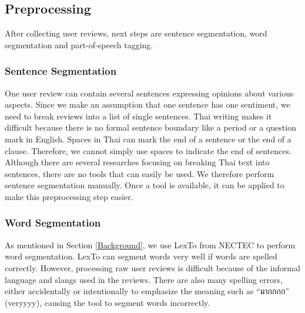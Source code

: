 \subsection{Preprocessing}

After collecting user reviews, next steps are sentence segmentation, word segmentation and part-of-speech tagging. 

\subsubsection{Sentence Segmentation}
One user review can contain several sentences expressing opinions about various aspects. 
Since we make an assumption that one sentence has one sentiment, we need to break reviews into a list of single sentences. Thai writing makes it difficult because there is no formal sentence boundary like a period or a question mark in English. Spaces in Thai can mark the end of a sentence or the end of a clause. Therefore, we cannot simply use spaces to indicate the end of sentences. Although there are several researches focusing on breaking Thai text into sentences, there are no tools that can easily be used. We therefore perform sentence segmentation manually. Once a tool is available, it can be applied to make this preprocessing step easier. 

\subsubsection{Word Segmentation}
As mentioned in Section \ref{Background}, we use LexTo\cite{LexTo} from NECTEC to perform word segmentation. LexTo can segment words very well if words are spelled correctly. However, processing raw user reviews is difficult because of the informal language and slangs used in the reviews. There are also many spelling errors, either accidentally or intentionally to emphasize the meaning such as \enquote{{มากกกก}} (veryyyy), causing the tool to segment words incorrectly. 



